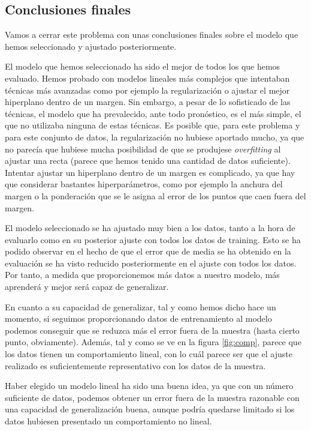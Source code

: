 \documentclass[11pt,a4paper]{article}
\begin{document}
    \subsection{Conclusiones finales}\label{conclusiones-finales}

Vamos a cerrar este problema con unas conclusiones finales sobre el
modelo que hemos seleccionado y ajustado posteriormente.

El modelo que hemos seleccionado ha sido el mejor de todos los que hemos
evaluado. Hemos probado con modelos lineales más complejos que
intentaban técnicas más avanzadas como por ejemplo la regularización o
ajustar el mejor hiperplano dentro de un margen. Sin embargo, a pesar de
lo sofisticado de las técnicas, el modelo que ha prevalecido, ante todo
pronóstico, es el más simple, el que no utilizaba ninguna de estas
técnicas. Es posible que, para este problema y para este conjunto de
datos, la regularización no hubiese aportado mucho, ya que no parecía
que hubiese mucha posibilidad de que se produjese \emph{overfitting} al
ajustar una recta (parece que hemos tenido una cantidad de datos
suficiente). Intentar ajustar un hiperplano dentro de un margen es
complicado, ya que hay que considerar bastantes hiperparámetros, como
por ejemplo la anchura del margen o la ponderación que se le asigna al
error de los puntos que caen fuera del margen.

El modelo seleccionado se ha ajustado muy bien a los datos, tanto a la
hora de evaluarlo como en su posterior ajuste con todos los datos de
training. Esto se ha podido observar en el hecho de que el error que de
media se ha obtenido en la evaluación se ha visto reducido
posteriormente en el ajuste con todos los datos. Por tanto, a medida que
proporcionemos más datos a nuestro modelo, más aprenderá y mejor será
capaz de generalizar.

En cuanto a su capacidad de generalizar, tal y como hemos dicho hace un
momento, si seguimos proporcionando datos de entrenamiento al modelo
podemos conseguir que se reduzca más el error fuera de la muestra (hasta
cierto punto, obviamente). Además, tal y como se ve en la figura \ref{fig:comp},
parece que los datos tienen un comportamiento lineal, con lo cuál parece
ser que el ajuste realizado es suficientemente representativo con los
datos de la muestra.

Haber elegido un modelo lineal ha sido una buena idea, ya que con un
número suficiente de datos, podemos obtener un error fuera de la muestra
razonable con una capacidad de generalización buena, aunque podría
quedarse limitado si los datos hubiesen presentado un comportamiento no
lineal.
\end{document}
